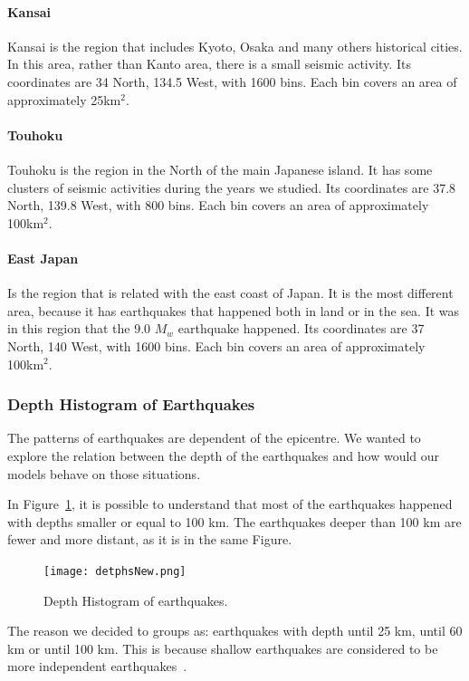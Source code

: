 \paragraph{Kansai} Kansai is the region that includes Kyoto, Osaka and many others historical cities. In this area, rather than Kanto area, there is a small seismic activity. Its coordinates are 34 North, 134.5 West, with 1600 bins. Each bin covers an area of approximately 25km$^2$.

\paragraph{Touhoku} Touhoku is the region in the North of the main Japanese island. It has some clusters of seismic activities during the years we studied. Its coordinates are 37.8 North, 139.8 West, with  800 bins. Each bin covers an area of approximately 100km$^2$. 

\paragraph{East Japan} Is the region that is related with the east coast of Japan. It is the most different area, because it has earthquakes that happened both in land or in the sea. It was in this region that the 9.0 $M_w$ earthquake happened. Its coordinates are 37 North, 140 West, with 1600 bins. Each bin covers an area of approximately 100km$^2$. 

\subsubsection{Depth Histogram of Earthquakes}


The patterns of earthquakes are dependent of the epicentre. We wanted to explore the relation between the depth of the earthquakes and how would our models behave on those situations.

In Figure~\ref{histogramQuakes}, it is possible to understand that most of the earthquakes happened with depths smaller or equal to 100 km. The earthquakes deeper than 100 km are fewer and more distant, as it is in the same Figure.\\

\begin{figure}[!htb]
	\centering
	\texttt{[image: detphsNew.png]}
	\caption{Depth Histogram of earthquakes.}
	\label{histogramQuakes}
\end{figure}

The reason we decided to groups as: earthquakes with depth until 25 km, until 60 km or until 100 km. This is because shallow earthquakes are considered to be more independent earthquakes~\cite{yamanaka1990scaling}.

